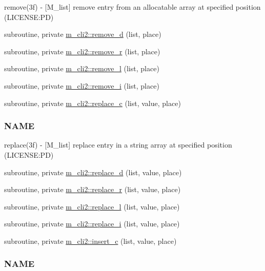 \begin{DoxyCompactItemize}
\begin{DoxyCompactList}
remove(3f) -\/ \mbox{[}M\+\_\+list\mbox{]} remove entry from an allocatable array at specified position (L\+I\+C\+E\+N\+SE\+:PD) \end{DoxyCompactList}\item 
subroutine, private \mbox{\hyperlink{namespacem__cli2_a5deb6a427a39e04c5a18a82497d5cf84}{m\+\_\+cli2\+::remove\+\_\+d}} (list, place)
\item 
subroutine, private \mbox{\hyperlink{namespacem__cli2_a281edafaa6f74c30bd8de6d0c1d05be6}{m\+\_\+cli2\+::remove\+\_\+r}} (list, place)
\item 
subroutine, private \mbox{\hyperlink{namespacem__cli2_ae3fc38d25a8a4892bde95a7198c2495a}{m\+\_\+cli2\+::remove\+\_\+l}} (list, place)
\item 
subroutine, private \mbox{\hyperlink{namespacem__cli2_a1c2bd26b3c04a499cc65b00133dfe6b9}{m\+\_\+cli2\+::remove\+\_\+i}} (list, place)
\item 
subroutine, private \mbox{\hyperlink{namespacem__cli2_affd644ac84d1010b40748f80d142d6b3}{m\+\_\+cli2\+::replace\+\_\+c}} (list, value, place)
\begin{DoxyCompactList}\small\item\em \subsubsection*{N\+A\+ME}

replace(3f) -\/ \mbox{[}M\+\_\+list\mbox{]} replace entry in a string array at specified position (L\+I\+C\+E\+N\+SE\+:PD) \end{DoxyCompactList}\item 
subroutine, private \mbox{\hyperlink{namespacem__cli2_ac327823dd714cd4c1667666158f0c135}{m\+\_\+cli2\+::replace\+\_\+d}} (list, value, place)
\item 
subroutine, private \mbox{\hyperlink{namespacem__cli2_abe681a8b55ae238b029766713a79210a}{m\+\_\+cli2\+::replace\+\_\+r}} (list, value, place)
\item 
subroutine, private \mbox{\hyperlink{namespacem__cli2_ae4a1802207f6b67e36cbf89003d6fb55}{m\+\_\+cli2\+::replace\+\_\+l}} (list, value, place)
\item 
subroutine, private \mbox{\hyperlink{namespacem__cli2_a0a591fd55e8010f26eb6f9f6bafc1ddb}{m\+\_\+cli2\+::replace\+\_\+i}} (list, value, place)
\item 
subroutine, private \mbox{\hyperlink{namespacem__cli2_ab3f2aa827b3b7ff419bcdc3ccb2672b3}{m\+\_\+cli2\+::insert\+\_\+c}} (list, value, place)
\begin{DoxyCompactList}\small\item\em \subsubsection*{N\+A\+ME}


\end{DoxyCompactList}
\end{DoxyCompactItemize}
